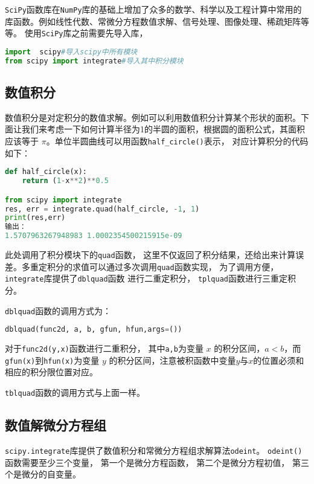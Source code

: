 
\verb|SciPy|函数库在\verb|NumPy|库的基础上增加了众多的数学、科学以及工程计算中常用的库函数。例如线性代数、常微分方程数值求解、信号处理、图像处理、稀疏矩阵等等。
使用\verb|SciPy|库之前需要先导入库，
\begin{lstlisting}[language=python]
import  scipy#导入scipy中所有模块
from scipy import integrate#导入其中积分模块
\end{lstlisting}
\subsection{数值积分}
数值积分是对定积分的数值求解。例如可以利用数值积分计算某个形状的面积。下面让我们来考虑一下如何计算半径为1的半圆的面积，根据圆的面积公式，其面积应该等于 $\pi$。单位半圆曲线可以用函数\verb|half_circle()|表示， 对应计算积分的代码如下：
\begin{lstlisting}[language=python]
def half_circle(x):
    return (1-x**2)**0.5

from scipy import integrate
res, err = integrate.quad(half_circle, -1, 1)
print(res,err)
输出：
1.5707963267948983 1.0002354500215915e-09
\end{lstlisting}
此处调用了积分模块下的\verb|quad|函数， 这里不仅返回了积分结果，还给出来计算误差。多重定积分的求值可以通过多次调用\verb|quad|函数实现， 为了调用方便， \verb|integrate|库提供了\verb|dblquad|函数
进行二重定积分， \verb|tplquad|函数进行三重定积分。

\verb|dblquad|函数的调用方式为：
\begin{lstlisting}[language=python]
dblquad(func2d, a, b, gfun, hfun,args=())
\end{lstlisting}
对于\verb|func2d(y,x)|函数进行二重积分， 其中\verb|a,b|为变量 $x$ 的积分区间，$ a < b $，而\verb|gfun(x)|到\verb|hfun(x)|为变量 $y$ 的积分区间，注意被积函数中变量$ y $与$ x $的位置必须和相应的积分限位置对应。

\verb|tblquad|函数的调用方式与上面一样。

\subsection{数值解微分方程组}
\verb|scipy.integrate|库提供了数值积分和常微分方程组求解算法\verb|odeint|。
\verb|odeint()|函数需要至少三个变量， 第一个是微分方程函数， 第二个是微分方程初值， 第三个是微分的自变量。

